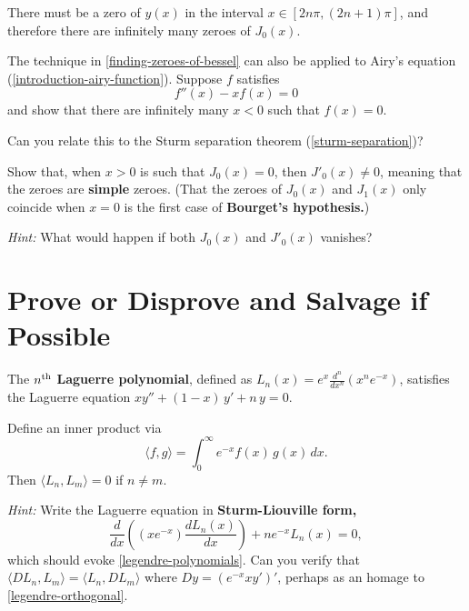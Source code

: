 \documentclass{homework}
\begin{document}
\begin{solution}
  There must be a zero of $y(x)$ in the interval $x \in [2 n \pi, (2n+1) \pi]$, and therefore there are infinitely many zeroes of $J_0(x)$.
\end{solution}

\begin{problem}The technique in \ref{finding-zeroes-of-bessel} can also be applied to Airy's equation (\ref{introduction-airy-function}).  Suppose $f$ satisfies
  \[
    f''(x) - x f(x) = 0
  \]
  and show that there are infinitely many $x < 0$ such that
  $f(x) = 0$.

  Can you relate this to the Sturm separation theorem
  (\ref{sturm-separation})?
\end{problem}

\begin{problem}
  Show that, when $x > 0$ is such that $J_0(x) = 0$, then
  $J'_0(x) \neq 0$, meaning that the zeroes are \textbf{simple}
  zeroes.  (That the zeroes of $J_0(x)$ and $J_1(x)$ only coincide when
  $x=0$ is the first case of \textbf{Bourget's hypothesis.})

  \textit{Hint:} What would happen if both $J_0(x)$ and $J'_0(x)$
  vanishes?
\end{problem}

\section{Prove or Disprove and Salvage if Possible}

\begin{problem}
  The $n^{\mbox{\scriptsize th}}$ \textbf{Laguerre polynomial}, defined as
  \(L_n(x) = e^x \displaystyle\frac{d^n}{dx^n} (x^n e^{-x})\),
  satisfies the Laguerre equation \(x y'' + (1-x) \, y' + n \, y = 0\).
\end{problem}

\begin{problem}
  Define an inner product via
  \[
    \langle f, g \rangle = \int_0^\infty e^{-x} f(x) \, g(x) \, dx.
  \]
  Then $\langle L_n, L_m \rangle = 0$ if $n \neq m$.
  
  \textit{Hint:}  Write the Laguerre equation in \textbf{Sturm-Liouville form,}
  \[
    \frac{d}{dx}\left(\left(x e^{-x}\right){\frac {d L_{n}(x)}{dx}}\right)+ n e^{-x} L_{n}(x)=0,
  \]
  which should evoke \ref{legendre-polynomials}.  Can you verify that $\langle D L_n, L_m \rangle = \langle L_n, DL_m \rangle$ where $Dy = (e^{-x} x y')'$, perhaps as an homage to \ref{legendre-orthogonal}.
\end{problem}

\end{document}
